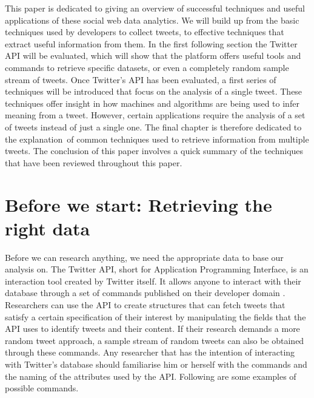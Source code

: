 \documentclass{article}
\begin{document}
This paper is dedicated to giving an overview of successful techniques and useful applications of these social web data analytics. 
We will build up from the basic techniques used by developers to collect tweets, to effective techniques that extract useful information from them. 
In the first following section the Twitter API will be evaluated, which will show that the platform offers useful tools and commands to retrieve 
specific datasets, or even a completely random sample stream of tweets. Once Twitter's API has been evaluated, a first series of techniques will be introduced
that focus on the analysis of a single tweet. These techniques offer insight in how machines and algorithms are being used to infer meaning from a tweet.
However, certain applications require the analysis of a set of tweets instead of just a single one. The final chapter is therefore dedicated to the explanation\
of common techniques used to retrieve information from multiple tweets. The conclusion of this paper involves a quick summary of the techniques that
have been reviewed throughout this paper.

\section{Before we start: Retrieving the right data}

Before we can research anything, we need the appropriate data to base our analysis on. The Twitter API, short for Application Programming Interface, is an
interaction tool created by Twitter itself. It allows anyone to interact with their database through a set of commands published on their developer domain \cite{TwitterDev}.
Researchers can use the API to create structures that can fetch tweets that satisfy a certain specification of their interest by manipulating the fields that
the API uses to identify tweets and their content. If their research demands a more random tweet approach, a sample stream of random tweets can also be 
obtained through these commands. Any researcher that has the intention of interacting with Twitter's database should familiarise him or herself with the 
commands and the naming of the attributes used by the API. Following are some examples of possible commands.
\end{document}
